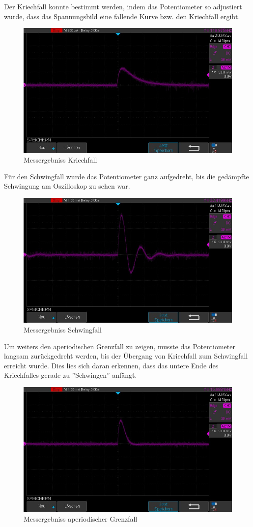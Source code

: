 \documentclass[12pt,a4paper,twoside]{article}
\begin{document}
\noindent
Der Kriechfall konnte bestimmt werden, indem das Potentiometer so adjustiert wurde, dass das Spannungsbild eine fallende Kurve bzw. den Kriechfall ergibt.

\begin{figure}[H]
    \centering
    \includegraphics[width=0.6\linewidth, angle=0]{Messergebnisse/3.3 Kriechfall/KriechfallNahe.jpg}
    \caption{Messergebniss Kriechfall}
    \label{fig:MessergebnissKriechfall}
\end{figure}

\noindent
Für den Schwingfall wurde das Potentiometer ganz aufgedreht, bis die gedämpfte Schwingung am Oszilloskop zu sehen war.

\begin{figure}[H]
    \centering
    \includegraphics[width=0.6\linewidth, angle=0]{Messergebnisse/3.3 Schwingfall/SchwingfallNahe.jpg}
    \caption{Messergebniss Schwingfall}
    \label{fig:MessergebnissSchwingfall}
\end{figure}

\noindent
Um weiters den aperiodischen Grenzfall zu zeigen, musste das Potentiometer langsam zurückgedreht werden, bis der Übergang von Kriechfall zum Schwingfall erreicht wurde.
Dies lies sich daran erkennen, dass das untere Ende des Kriechfalles gerade zu ''Schwingen'' anfängt.

\begin{figure}[H]
    \centering
    \includegraphics[width=0.6\linewidth, angle=0]{Messergebnisse/3.3 Grenzfall/GrenzfallNahe.jpg}
    \caption{Messergebniss aperiodischer Grenzfall}
    \label{fig:MessergebnissAperiodischerGrenzfall}
\end{figure}
\end{document}
